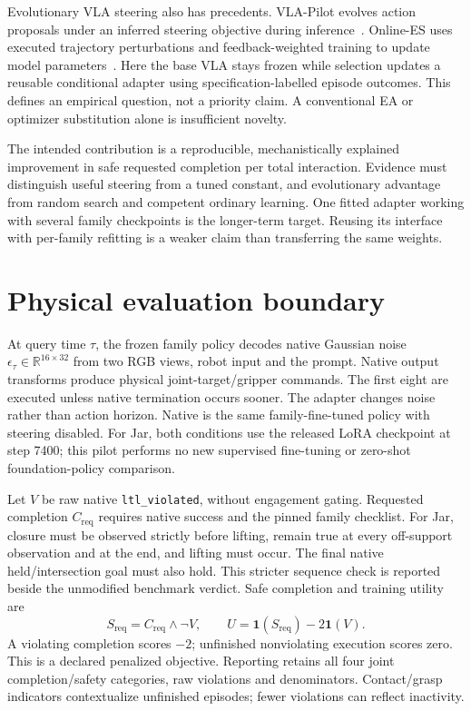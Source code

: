 \documentclass[sigconf,dvipsnames,balance=false]{acmart}
\newcommand{\ind}{\mathbf{1}}
\newcommand{\safe}{S_{\mathrm{req}}}
\newcommand{\complete}{C_{\mathrm{req}}}
\begin{document}
Evolutionary VLA steering also has precedents. VLA-Pilot evolves action proposals
under an inferred steering objective during inference~\cite{vlapilot}. Online-ES
uses executed trajectory perturbations and feedback-weighted training to update
model parameters~\cite{onlinees}. Here the base VLA stays frozen while selection
updates a reusable conditional adapter using specification-labelled episode
outcomes. This defines an empirical question, not a priority claim. A conventional
EA or optimizer substitution alone is insufficient novelty.

The intended contribution is a reproducible, mechanistically explained improvement
in safe requested completion per total interaction. Evidence must distinguish
useful steering from a tuned constant, and evolutionary advantage from random
search and competent ordinary learning. One fitted adapter working with several
family checkpoints is the longer-term target. Reusing its interface with per-family
refitting is a weaker claim than transferring the same weights.

\section{Physical evaluation boundary}
At query time $\tau$, the frozen family policy decodes native Gaussian noise
$\epsilon_\tau\in\mathbb R^{16\times32}$ from two RGB views, robot input and
the prompt. Native output transforms produce physical joint-target/gripper
commands. The first eight are executed unless native termination occurs sooner.
The adapter changes noise rather than action horizon. Native is the same
family-fine-tuned policy with steering disabled. For Jar, both conditions use
the released LoRA checkpoint at step 7400; this pilot performs no new supervised
fine-tuning or zero-shot foundation-policy comparison.

Let $V$ be raw native \texttt{ltl\_violated}, without engagement gating. Requested
completion $\complete$ requires native success and the pinned family checklist.
For Jar, closure must be observed strictly before lifting, remain true at every
off-support observation and at the end, and lifting must occur. The final native
held/intersection goal must also hold. This stricter sequence check is reported
beside the unmodified benchmark verdict. Safe completion and training utility are
\begin{equation}
 \safe=\complete\land\neg V,\qquad U=\ind(\safe)-2\ind(V).
 \label{eq:utility}
\end{equation}
A violating completion scores $-2$; unfinished nonviolating execution scores zero.
This is a declared penalized objective. Reporting retains all four joint
completion/safety categories, raw violations and denominators. Contact/grasp
indicators contextualize unfinished episodes; fewer violations can reflect inactivity.
\end{document}
